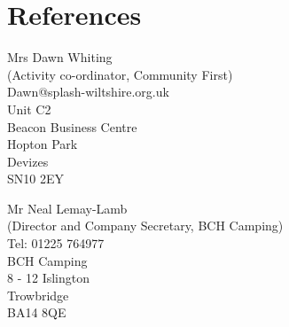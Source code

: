 \section*{References}
\begin{minipage}{0.5\linewidth}
Mrs Dawn Whiting\\
(Activity co-ordinator, Community First)\\
Dawn@splash-wiltshire.org.uk\\
Unit C2\\
Beacon Business Centre\\
Hopton Park\\
Devizes\\
SN10 2EY\\
\end{minipage}
\begin{minipage}{0.5\linewidth}
Mr Neal Lemay-Lamb\\
(Director and Company Secretary, BCH Camping)\\
Tel: 01225 764977\\
BCH Camping\\
8 - 12 Islington\\
Trowbridge\\
BA14 8QE\\
 \\
 
\end{minipage}